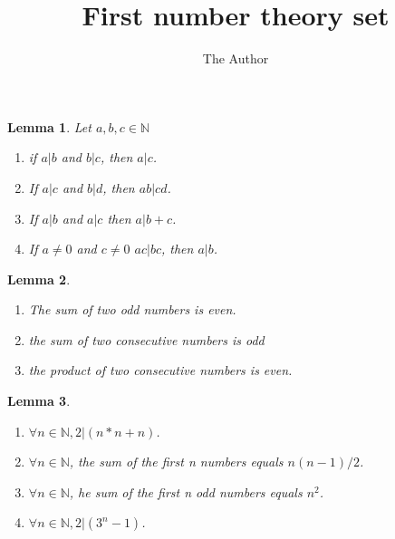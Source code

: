 \documentclass[11pt, oneside]{article}   	%
\title{First number theory set}
\author{The Author}
\begin{document}
\maketitle

\newtheorem{axiom}{Axiom}
\newtheorem{lemma}{Lemma}
\newtheorem{definition}{Definition}

\newtheorem{puzzle}{Puzzle}

\begin{lemma} Let $a,b,c \in \mathbb{N}$
\begin{enumerate}

\item  if $a | b$ and $b | c$, then $a | c$.
\item If $a | c$ and $b | d$, then $ab | cd$.
\item If   $a | b $ and $a | c$  then $a | b+c$.
\item If $a \ne  0$ and $c \ne 0$ $ac | bc$, then $a | b$.
\end{enumerate}

\end{lemma}

\begin{lemma}
\begin{enumerate}

\item The sum of two odd numbers is even.
\item the sum of two consecutive numbers is odd
\item the product of two consecutive numbers is even.


\end{enumerate}

\end{lemma}


\begin{lemma}

\begin{enumerate} 
\item $\forall n \in \mathbb{N},  2 | (n * n + n)$.
\item $\forall n \in \mathbb{N}$, the sum of the first n numbers equals $n(n-1)/2$.
\item $\forall n \in \mathbb{N}$, he sum of the first n odd numbers equals $n^2$.
\item $\forall n \in \mathbb{N}, 2 | (3^n - 1)$.



\end{enumerate}

\end{lemma}
\end{document}

